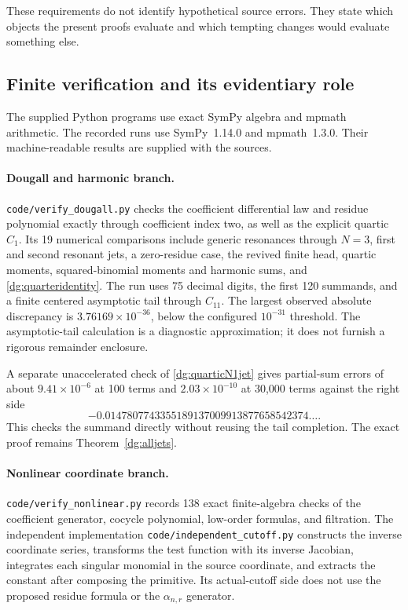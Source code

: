 \documentclass[11pt,a4paper]{article}
\numberwithin{equation}{section}
\theoremstyle{definition}
\theoremstyle{remark}
\newcommand{\src}[1]{\nolinkurl{#1}}
\begin{document}
These requirements do not identify hypothetical source errors. They
state which objects the present proofs evaluate and which tempting
changes would evaluate something else.

\subsection{Finite verification and its evidentiary role}
The supplied Python programs use exact SymPy algebra and mpmath
arithmetic. The recorded runs use SymPy~1.14.0 and mpmath~1.3.0.
Their machine-readable results are supplied with the sources.

\paragraph{Dougall and harmonic branch.}
\src{code/verify_dougall.py} checks the coefficient differential
law and residue polynomial exactly through coefficient index two,
as well as the explicit quartic $C_1$. Its 19 numerical comparisons
include generic resonances through $N=3$, first and second resonant
jets, a zero-residue case, the revived finite head, quartic moments,
squared-binomial moments and harmonic sums, and
\eqref{dg:quarteridentity}. The run uses 75 decimal digits, the first
120 summands, and a finite centered asymptotic tail through $C_{11}$.
The largest observed absolute discrepancy is
$3.76169\times10^{-36}$, below the configured $10^{-31}$ threshold.
The asymptotic-tail calculation is a diagnostic approximation; it
does not furnish a rigorous remainder enclosure.

A separate unaccelerated check of \eqref{dg:quarticN1jet} gives
partial-sum errors of about $9.41\times10^{-6}$ at 100 terms and
$2.03\times10^{-10}$ at 30,000 terms against the right side
\[
-0.0147807743355189137009913877658542374\ldots.
\]
This checks the summand directly without reusing the tail completion.
The exact proof remains Theorem~\ref{dg:alljets}.

\paragraph{Nonlinear coordinate branch.}
\src{code/verify_nonlinear.py} records 138 exact finite-algebra
checks of the coefficient generator, cocycle polynomial,
low-order formulas, and filtration. The independent implementation
\src{code/independent_cutoff.py} constructs the inverse coordinate
series, transforms the test function with its inverse Jacobian,
integrates each singular monomial in the source coordinate, and
extracts the constant after composing the primitive. Its actual-cutoff
side does not use the proposed residue formula or the
$\alpha_{n,r}$ generator.
\end{document}

